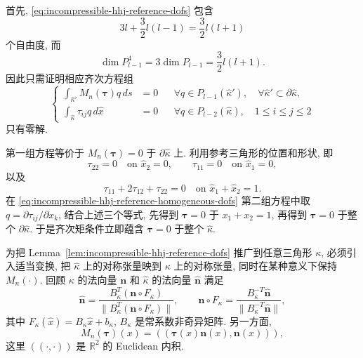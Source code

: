 \begin{Proof}
首先, \eqref{eq:incompressible-hhj-reference-dofs}
包含
\[
3l+\frac32l(l-1)=\frac32l(l+1)
\]
个自由度, 而
\[
\dim P_{l-1}^4=3\dim P_{l-1}
=\frac32l(l+1).
\]
因此只需证明相应齐次方程组
\begin{equation}\label{eq:incompressible-hhj-reference-homogeneous-dofs}
\left\{
\begin{aligned}
\int_{\widehat\kappa'}M_n(\boldsymbol\tau)q\,ds&=0
&&\forall q\in P_{l-1}(\widehat\kappa'),
\quad\forall\widehat\kappa'\subset\partial\widehat\kappa,\\
\int_{\widehat\kappa}\tau_{ij}q\,d\widehat x&=0
&&\forall q\in P_{l-2}(\widehat\kappa),
\quad1\leq i\leq j\leq2
\end{aligned}
\right.
\end{equation}
只有零解.

第一组方程等价于
$M_n(\boldsymbol\tau)=0$ 于 $\partial\widehat\kappa$ 上.
利用参考三角形的位置和形状, 即
\[
\tau_{22}=0\quad\text{on }\widehat x_2=0,
\qquad
\tau_{11}=0\quad\text{on }\widehat x_1=0,
\]
以及
\[
\tau_{11}+2\tau_{12}+\tau_{22}=0
\quad\text{on }\widehat x_1+\widehat x_2=1.
\]
在 \eqref{eq:incompressible-hhj-reference-homogeneous-dofs}
第二组方程中取 $q=\partial\tau_{ij}/\partial x_k$,
结合上述三个等式, 先得到
$\boldsymbol\tau=0$ 于 $x_1+x_2=1$, 再得到
$\boldsymbol\tau=0$ 于整个 $\partial\widehat\kappa$.
于是齐次矩条件立即蕴含
$\boldsymbol\tau=0$ 于整个 $\widehat\kappa$.
\end{Proof}

为把 Lemma~\ref{lem:incompressible-hhj-reference-dofs}
推广到任意三角形 $\kappa$, 必须引入适当变换,
把 $\widehat\kappa$ 上的对称张量映到 $\kappa$ 上的对称张量,
同时在某种意义下保持 $M_n(\cdot)$.
回顾 $\kappa$ 的法向量 $\mathbf n$
和 $\widehat\kappa$ 的法向量 $\widehat{\mathbf n}$ 满足
\[
\widehat{\mathbf n}
=\frac{B_\kappa^T(\mathbf n\circ F_\kappa)}
{\|B_\kappa^T(\mathbf n\circ F_\kappa)\|},
\qquad
\mathbf n\circ F_\kappa
=\frac{B_\kappa^{-T}\widehat{\mathbf n}}
{\|B_\kappa^{-T}\widehat{\mathbf n}\|},
\]
其中 $F_\kappa(\widehat x)=B_\kappa\widehat x+b_\kappa$,
$B_\kappa$ 是常系数非奇异矩阵.
另一方面,
\[
M_n(\boldsymbol\tau)(x)
=((\boldsymbol\tau(x)\mathbf n(x),\mathbf n(x))),
\]
这里 $((\cdot,\cdot))$ 是 $\mathbb R^2$ 的 Euclidean 内积.


